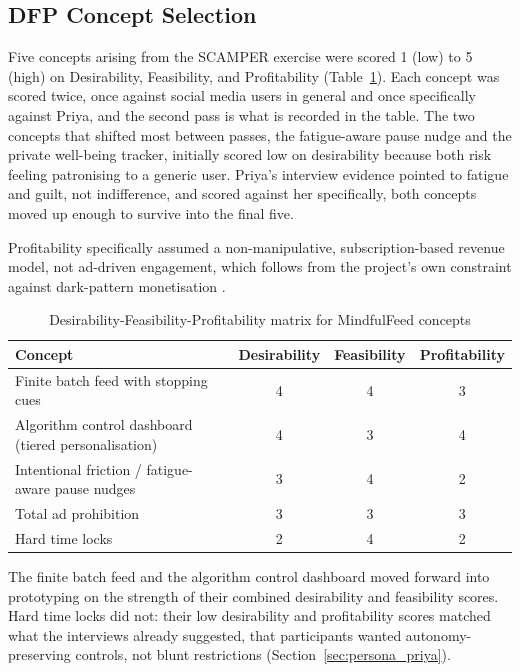\documentclass[11pt]{article}
\begin{document}
\subsection{DFP Concept Selection}
\label{sec:dfp_mindfulfeed}
Five concepts arising from the SCAMPER exercise were scored 1 (low) to 5 (high) on Desirability, Feasibility, and Profitability (Table~\ref{tab:dfp_mindfulfeed}). Each concept was scored twice, once against social media users in general and once specifically against Priya, and the second pass is what is recorded in the table. The two concepts that shifted most between passes, the fatigue-aware pause nudge and the private well-being tracker, initially scored low on desirability because both risk feeling patronising to a generic user. Priya's interview evidence pointed to fatigue and guilt, not indifference, and scored against her specifically, both concepts moved up enough to survive into the final five.

Profitability specifically assumed a non-manipulative, subscription-based revenue model, not ad-driven engagement, which follows from the project's own constraint against dark-pattern monetisation \parencites[8]{4807303}.

\begin{table}[h]
\centering
\caption{Desirability-Feasibility-Profitability matrix for MindfulFeed concepts}
\label{tab:dfp_mindfulfeed}
\small
\begin{tabular}{p{5.5cm}ccc}
\hline
\textbf{Concept} & \textbf{Desirability} & \textbf{Feasibility} & \textbf{Profitability} \\
\hline
Finite batch feed with stopping cues & 4 & 4 & 3 \\
Algorithm control dashboard (tiered personalisation) & 4 & 3 & 4 \\
Intentional friction / fatigue-aware pause nudges & 3 & 4 & 2 \\
Total ad prohibition & 3 & 3 & 3 \\
Hard time locks & 2 & 4 & 2 \\
\hline
\end{tabular}
\end{table}

The finite batch feed and the algorithm control dashboard moved forward into prototyping on the strength of their combined desirability and feasibility scores. Hard time locks did not: their low desirability and profitability scores matched what the interviews already suggested, that participants wanted autonomy-preserving controls, not blunt restrictions (Section~\ref{sec:persona_priya}).
\end{document}
